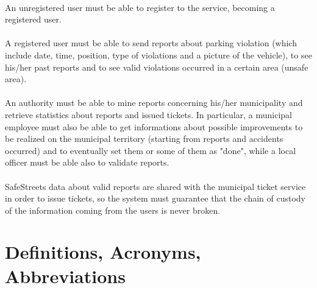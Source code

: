 			\paragraph{}
				An unregistered user must be able to register to the service, becoming a registered user.
			\paragraph{}
				A registered user must be able to send reports about parking violation (which include date, time, position, type of violations and a picture of the vehicle), to see his/her past reports and to see valid violations occurred in a certain area (unsafe area).
			\paragraph{}
				An authority must be able to mine reports concerning his/her municipality and retrieve statistics about reports and issued tickets. 
			In particular, a municipal employee must also be able to get informations about possible improvements to be realized on the municipal territory (starting from reports and accidents occurred) and to eventually set them or some of them as "done", while a local officer must be able also to validate reports.
			\paragraph{}
				SafeStreets data about valid reports are shared with the municipal ticket service in order to issue tickets, so the system must guarantee that the chain of custody of the information coming from the users is never broken.
	
		\section{Definitions, Acronyms, Abbreviations}
